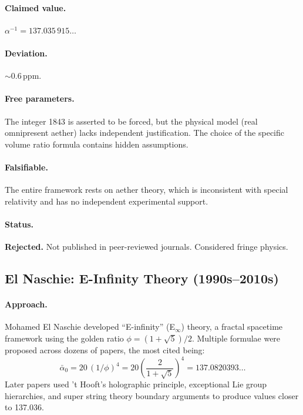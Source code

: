 \documentclass[11pt,a4paper]{article}
\begin{document}
\paragraph{Claimed value.}
$\alpha^{-1} = 137.035\,915\ldots$

\paragraph{Deviation.}
$\sim 0.6$\,ppm.

\paragraph{Free parameters.}
The integer 1843 is asserted to be forced, but the physical model (real omnipresent aether) lacks independent justification.  The choice of the specific volume ratio formula contains hidden assumptions.

\paragraph{Falsifiable.}
The entire framework rests on aether theory, which is inconsistent with special relativity and has no independent experimental support.

\paragraph{Status.}
\textbf{Rejected.}  Not published in peer-reviewed journals.  Considered fringe physics.

\subsection{El Naschie: E-Infinity Theory (1990s--2010s)}\label{sec:elnaschie}

\paragraph{Approach.}
Mohamed El Naschie developed ``E-infinity'' (E$_\infty$) theory, a fractal spacetime framework using the golden ratio $\phi = (1+\sqrt{5})/2$.  Multiple formulae were proposed across dozens of papers, the most cited being:
\begin{equation}
\bar{\alpha}_0 = 20\,(1/\phi)^4 = 20\left(\frac{2}{1+\sqrt{5}}\right)^4 = 137.0820393\ldots
\end{equation}
Later papers used 't Hooft's holographic principle, exceptional Lie group hierarchies, and super string theory boundary arguments to produce values closer to 137.036.
\end{document}
